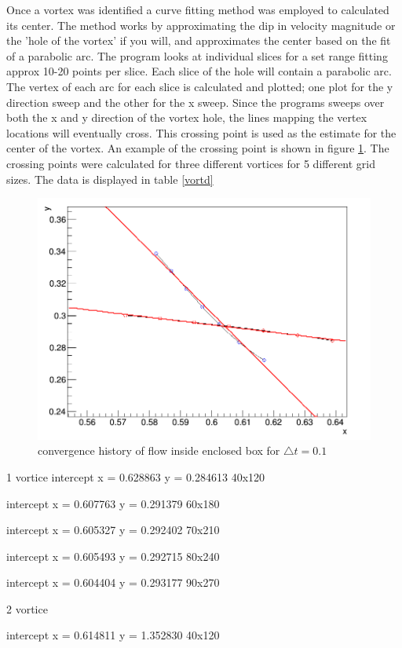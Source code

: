 \documentclass[paper=a4, fontsize=11pt, abstract=on]{scrartcl}
\numberwithin{equation}{section}		%
\numberwithin{figure}{section}			%
\numberwithin{table}{section}				%
\begin{document}
 Once a vortex was identified a curve fitting method was employed to calculated its center. The method works by approximating the dip in velocity magnitude or the 'hole of the vortex' if you will, and approximates the center based on the fit of a parabolic arc. The program looks at individual slices for a set range fitting approx 10-20 points per slice. Each slice of the hole will contain a parabolic arc. The vertex of each arc for each slice is calculated and plotted; one plot for the y direction sweep and the other for the x sweep. Since the programs sweeps over both the x and y direction of the vortex hole, the lines mapping the vertex locations will eventually cross. This crossing point is used as the estimate for the center of the vortex. An example of the crossing point is shown in figure \ref{cross}. The crossing points were calculated for three different vortices for 5 different grid sizes. The data is displayed in table \ref{vortd}

\begin{figure}[H]
\centering
\includegraphics[width=0.80\linewidth]{cross}
\caption{convergence history of flow inside enclosed box for $\triangle t = 0.1$}
\label{cross}
\end{figure}


1 vortice
intercept x = 0.628863 y = 0.284613   40x120

intercept x = 0.607763 y = 0.291379   60x180

intercept x = 0.605327 y = 0.292402   70x210

intercept x = 0.605493 y = 0.292715   80x240

intercept x = 0.604404 y = 0.293177   90x270

2 vortice

intercept x = 0.614811 y = 1.352830   40x120
\end{document}
